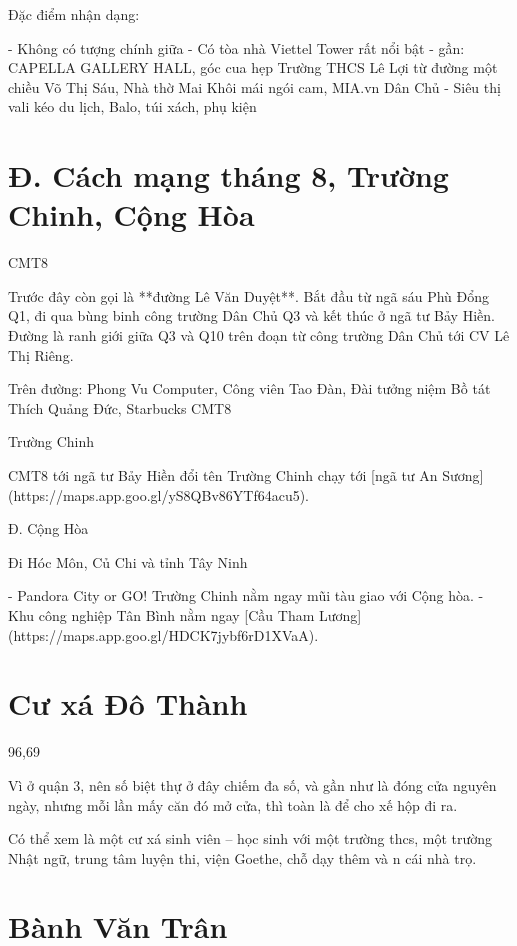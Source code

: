 Đặc điểm nhận dạng:

- Không có tượng chính giữa
- Có tòa nhà Viettel Tower rất nổi bật
- gần: CAPELLA GALLERY HALL, góc cua hẹp Trường THCS Lê Lợi từ đường một chiều Võ Thị Sáu, Nhà thờ Mai Khôi mái ngói cam, MIA.vn Dân Chủ - Siêu thị vali kéo du lịch, Balo, túi xách, phụ kiện

\section{Đ. Cách mạng tháng 8, Trường Chinh, Cộng Hòa}

CMT8

Trước đây còn gọi là **đường Lê Văn Duyệt**. Bắt đầu từ ngã sáu Phù Đổng Q1, đi qua bùng binh công trường Dân Chủ Q3 và kết thúc ở ngã tư Bảy Hiền. Đường là ranh giới giữa Q3 và Q10 trên đoạn từ công trường Dân Chủ tới CV Lê Thị Riêng.

Trên đường: Phong Vu Computer, Công viên Tao Đàn, Đài tưởng niệm Bồ tát Thích Quảng Đức, Starbucks CMT8

Trường Chinh

CMT8 tới ngã tư Bảy Hiền đổi tên Trường Chinh chạy tới [ngã tư An Sương](https://maps.app.goo.gl/yS8QBv86YTf64acu5).

Đ. Cộng Hòa

Đi Hóc Môn, Củ Chi và tỉnh Tây Ninh

- Pandora City or GO! Trường Chinh nằm ngay mũi tàu giao với Cộng hòa.
- Khu công nghiệp Tân Bình nằm ngay [Cầu Tham Lương](https://maps.app.goo.gl/HDCK7jybf6rD1XVaA).

\section{Cư xá Đô Thành}

96,69%

Vì ở quận 3, nên số biệt thự ở đây chiếm đa số, và gần như là đóng cửa nguyên ngày, nhưng mỗi lần mấy căn đó mở cửa, thì toàn là để cho xế hộp đi ra.

Có thể xem là một cư xá sinh viên – học sinh với một trường thcs, một trường Nhật ngữ, trung tâm luyện thi, viện Goethe, chỗ dạy thêm và n cái nhà trọ.

\section{Bành Văn Trân}

